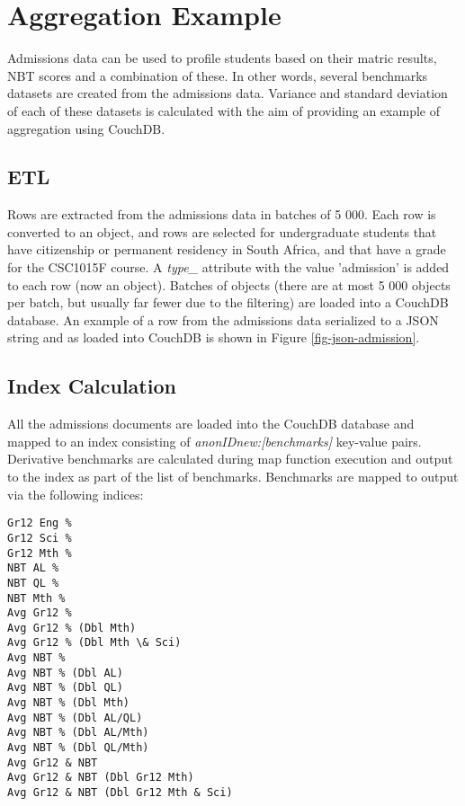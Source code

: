 \section{Aggregation Example}
\label{aggregation}
Admissions data can be used to profile students based on their matric results, NBT scores and a combination of these. In other words, several benchmarks datasets are created from the admissions data. Variance and standard deviation of each of these datasets is calculated with the aim of providing an example of aggregation using CouchDB.

\subsection{ETL}
Rows are extracted from the admissions data in batches of 5 000. Each row is converted to an object, and rows are selected for undergraduate students that have citizenship or permanent residency in South Africa, and that have a grade for the CSC1015F course. A \textit{type\_} attribute with the value 'admission' is added to each row (now an object). Batches of objects (there are at most 5 000 objects per batch, but usually far fewer due to the filtering) are loaded into a CouchDB database. An example of a row from the admissions data serialized to a JSON string and as loaded into CouchDB is shown in Figure \ref{fig-json-admission}.



\subsection{Index Calculation}
All the admissions documents are loaded into the CouchDB database and mapped to an index consisting of \textit{anonIDnew:[benchmarks]} key-value pairs. Derivative benchmarks are calculated during map function execution and output to the index as part of the list of benchmarks. Benchmarks are mapped to output via the following indices:

\begin{verbatim}
Gr12 Eng % 
Gr12 Sci % 
Gr12 Mth % 
NBT AL % 
NBT QL % 
NBT Mth % 
Avg Gr12 % 
Avg Gr12 % (Dbl Mth)
Avg Gr12 % (Dbl Mth \& Sci)
Avg NBT % 
Avg NBT % (Dbl AL)
Avg NBT % (Dbl QL)
Avg NBT % (Dbl Mth)
Avg NBT % (Dbl AL/QL)
Avg NBT % (Dbl AL/Mth)
Avg NBT % (Dbl QL/Mth)
Avg Gr12 & NBT 
Avg Gr12 & NBT (Dbl Gr12 Mth)
Avg Gr12 & NBT (Dbl Gr12 Mth & Sci)
\end{verbatim}

